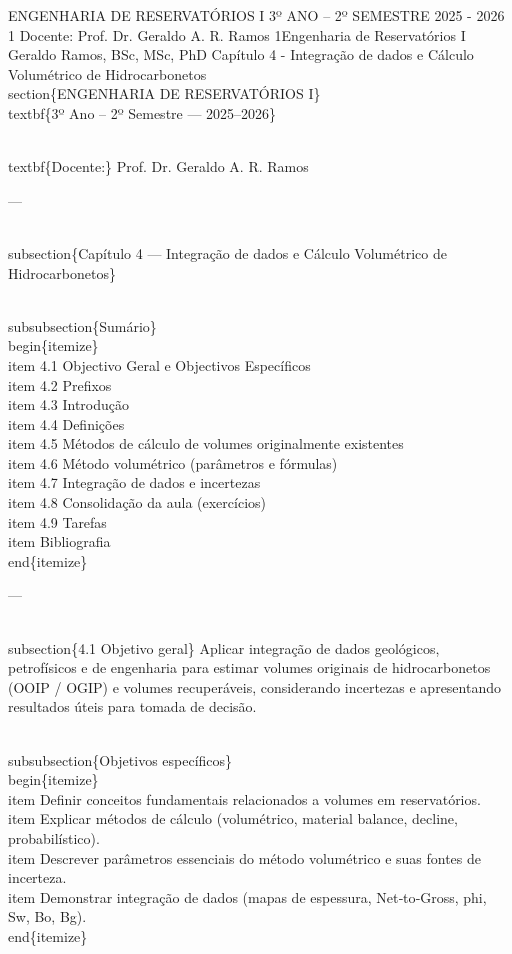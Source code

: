\documentclass[11pt,a4paper]{article}
\begin{document}
\begin{enumerate}
{ENGENHARIA DE RESERVATÓRIOS I
3º ANO – 2º SEMESTRE
2025 - 2026
1
Docente: Prof. Dr. Geraldo A. R. Ramos
1Engenharia de Reservatórios I
Geraldo Ramos, BSc, MSc, PhD
Capítulo 4 - Integração de dados e Cálculo Volumétrico de Hidrocarbonetos
\\section\{ENGENHARIA DE RESERVATÓRIOS I\}
 \\textbf\{3º Ano – 2º Semestre — 2025–2026\}

 \\textbf\{Docente:\} Prof. Dr. Geraldo A. R. Ramos

 ---

\\subsection\{Capítulo 4 — Integração de dados e Cálculo Volumétrico de Hidrocarbonetos\}

\\subsubsection\{Sumário\}
\\begin\{itemize\}
\\item 4.1 Objectivo Geral e Objectivos Específicos
\\item 4.2 Prefixos
\\item 4.3 Introdução
\\item 4.4 Definições
\\item 4.5 Métodos de cálculo de volumes originalmente existentes
\\item 4.6 Método volumétrico (parâmetros e fórmulas)
\\item 4.7 Integração de dados e incertezas
\\item 4.8 Consolidação da aula (exercícios)
\\item 4.9 Tarefas
\\item Bibliografia
\\end\{itemize\}

 ---

\\subsection\{4.1 Objetivo geral\}
Aplicar integração de dados geológicos, petrofísicos e de engenharia para estimar volumes originais de hidrocarbonetos (OOIP / OGIP) e volumes recuperáveis, considerando incertezas e apresentando resultados úteis para tomada de decisão.

\\subsubsection\{Objetivos específicos\}
\\begin\{itemize\}
\\item Definir conceitos fundamentais relacionados a volumes em reservatórios.
\\item Explicar métodos de cálculo (volumétrico, material balance, decline, probabilístico).
\\item Descrever parâmetros essenciais do método volumétrico e suas fontes de incerteza.
\\item Demonstrar integração de dados (mapas de espessura, Net‑to‑Gross, phi, Sw, Bo, Bg).
\\end\{itemize\}

}
\end{enumerate}
\end{document}
